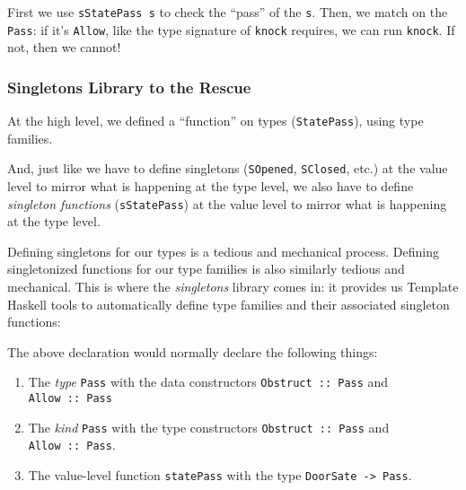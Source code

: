 \documentclass[]{article}
\newenvironment{Shaded}{}{}
\newcommand{\FunctionTok}[1]{\textcolor[rgb]{0.02,0.16,0.49}{#1}}
\newcommand{\NormalTok}[1]{#1}
\begin{document}
First we use \texttt{sStatePass\ s} to check the ``pass'' of the \texttt{s}.
Then, we match on the \texttt{Pass}: if it's \texttt{Allow}, like the type
signature of \texttt{knock} requires, we can run \texttt{knock}. If not, then we
cannot!

\hypertarget{singletons-library-to-the-rescue}{%
\subsubsection{Singletons Library to the
Rescue}\label{singletons-library-to-the-rescue}}

At the high level, we defined a ``function'' on types (\texttt{StatePass}),
using type families.

And, just like we have to define singletons (\texttt{SOpened}, \texttt{SClosed},
etc.) at the value level to mirror what is happening at the type level, we also
have to define \emph{singleton functions} (\texttt{sStatePass}) at the value
level to mirror what is happening at the type level.

Defining singletons for our types is a tedious and mechanical process. Defining
singletonized functions for our type families is also similarly tedious and
mechanical. This is where the \emph{singletons} library comes in: it provides us
Template Haskell tools to automatically define type families and their
associated singleton functions:

\begin{Shaded}
\end{Shaded}

The above declaration would normally declare the following things:

\begin{enumerate}
\def\labelenumi{\arabic{enumi}.}
\tightlist
\item
  The \emph{type} \texttt{Pass} with the data constructors
  \texttt{Obstruct\ ::\ Pass} and \texttt{Allow\ ::\ Pass}
\item
  The \emph{kind} \texttt{Pass} with the type constructors
  \texttt{\textquotesingle{}Obstruct\ ::\ Pass} and
  \texttt{\textquotesingle{}Allow\ ::\ Pass}.
\item
  The value-level function \texttt{statePass} with the type
  \texttt{DoorSate\ -\textgreater{}\ Pass}.
\end{enumerate}
\end{document}
